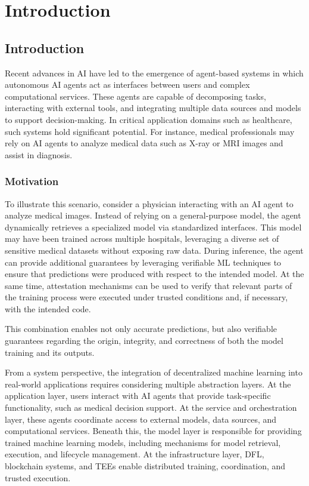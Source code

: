 \chapter{Introduction}
\label{cha:chapter1}

\section{Introduction}

Recent advances in \ac{AI} have led to the emergence of agent-based systems in which autonomous \ac{AI} agents act as interfaces between users and complex computational services. These agents are capable of decomposing tasks, interacting with external tools, and integrating multiple data sources and models to support decision-making. In critical application domains such as healthcare, such systems hold significant potential. For instance, medical professionals may rely on \ac{AI} agents to analyze medical data such as X-ray or MRI images and assist in diagnosis.

\subsection{Motivation}

To illustrate this scenario, consider a physician interacting with an \ac{AI} agent to analyze medical images. Instead of relying on a general-purpose model, the agent dynamically retrieves a specialized model via standardized interfaces. This model may have been trained across multiple hospitals, leveraging a diverse set of sensitive medical datasets without exposing raw data. During inference, the agent can provide additional guarantees by leveraging verifiable \ac{ML} techniques to ensure that predictions were produced with respect to the intended model. At the same time, attestation mechanisms can be used to verify that relevant parts of the training process were executed under trusted conditions and, if necessary, with the intended code.

This combination enables not only accurate predictions, but also verifiable guarantees regarding the origin, integrity, and correctness of both the model training and its outputs.

From a system perspective, the integration of decentralized machine learning into real-world applications requires considering multiple abstraction layers. At the application layer, users interact with \ac{AI} agents that provide task-specific functionality, such as medical decision support. At the service and orchestration layer, these agents coordinate access to external models, data sources, and computational services. Beneath this, the model layer is responsible for providing trained machine learning models, including mechanisms for model retrieval, execution, and lifecycle management. At the infrastructure layer, \ac{DFL}, blockchain systems, and \acp{TEE} enable distributed training, coordination, and trusted execution.

